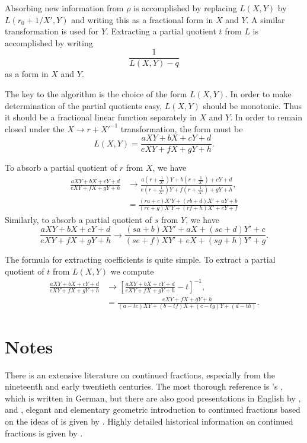 Absorbing new information from $\rho$ is accomplished by replacing
$L(X,Y)$ by $L(r_0 + 1/X',Y)$ and writing this as a fractional form in
$X$ and $Y$.  A similar transformation is used for $Y$.
Extracting a partial quotient $t$ from $L$ is accomplished by writing
\[
\frac{1}{L(X,Y)-q}
\]
as a form in $X$ and $Y$.

The key to the algorithm is the choice of the form $L(X,Y)$.  In order
to make determination of the partial quotients easy, $L(X,Y)$ should
be monotonic. Thus it should be a fractional linear function
separately in $X$ and $Y$.  In order to remain closed under the 
$X \rightarrow r + {X'}^{-1}$ transformation, the form must
be
\[
L(X, Y) = \frac{aXY + b X + c Y + d}{e XY + f X + g Y + h}.
\]

To absorb a partial quotient of $r$ from $X$, we have
\[
\begin{aligned}
 \frac{aXY + b X + c Y + d}{e XY + f X + g Y + h} &\longrightarrow
 \frac{a\left(r + \frac{1}{X'}\right)Y + b \left(r + \frac{1}{X'}\right) + c Y + d}{e \left(r + \frac{1}{X'}\right)Y + f \left(r + \frac{1}{X'}\right) + g Y + h},\\
&= \frac{(r a + c)X'Y + (rb + d) X' + a Y + b}{(r e + g)X'Y + (rf + h) X' + e Y + f}
\end{aligned}
\]
Similarly, to absorb a partial quotient of $s$ from $Y$, we have
\[
 \frac{aXY + b X + c Y + d}{e XY + f X + g Y + h} \longrightarrow
\frac{(s a + b)XY' + a X + (sc + d) Y' + c}{(s e + f)XY' + e X + (sg + h)
Y' + g}.
\]

The formula for extracting  coefficients is quite simple.  To extract
a partial quotient of $t$ from $L(X,Y)$ we compute
\[
\begin{aligned}
 \frac{aXY + b X + c Y + d}{e XY + f X + g Y + h} &\longrightarrow
 \left[ \frac{aXY + b X + c Y + d}{e XY + f X + g Y + h} -
t\right]^{-1}, \\
 & =  \frac{e XY + f X + g Y + h}{(a - t e)XY + (b- tf) X + (c - tg) Y
+ (d - th)}.
\end{aligned}
\]

\section*{Notes}


\small

There is an extensive literature on continued fractions, especially
from the nineteenth and early twentieth centuries.  The most thorough
reference is {\Perron}'s \cite{Perron1977-kr}, which is written in German,
but there are also good presentations in English by {\Chrystal}
\cite{Chrystal2015-uy}, {\Hardy} and {\Wright} \cite{Hardy2008-bt},
elegant and elementary geometric introduction to continued fractions
based on the ideas of {\Klein} \cite{Klein1895-td} is given by {\Stark}
\cite{Stark1978-tx}.  Highly detailed historical information on
continued fractions is given by {\Brezinski} \cite{Brezinksi1991-yh}.



